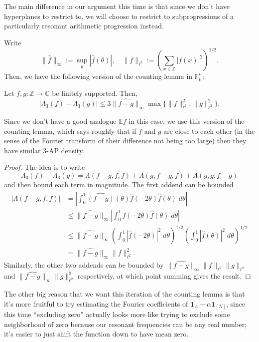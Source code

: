 \documentclass[10pt]{scrartcl}
\providecommand{\CC}{\mathbb C}
\providecommand{\EE}{\mathbb E}
\providecommand{\FF}{\mathbb F}
\providecommand{\ZZ}{\mathbb Z}
\providecommand{\ind}[1]{\mathbf 1_{#1}}
\providecommand{\abs}[1]{\left|{#1}\right|}
\providecommand{\dif}{\;d}
\renewcommand{\hat}{\widehat}
\providecommand{\norm}[1]{\| #1 \|}
\begin{document}
The main difference in our argument this time is that
since we don't have hyperplanes to restrict to, we will choose to restrict to
subprogressions of a particularly resonant arithmetic progression instead.

Write
\[\norm{\hat f}_\infty := \sup_{\theta}|\hat f(\theta)|,\quad
\norm f_{\ell^2} := \left(\sum_{x\in\ZZ} |f(x)|^2\right)^{1/2}.\]
Then, we have the following version of the counting lemma in $\FF_p^n$:
\begin{lemma}
	Let $f,g\colon\ZZ\to\CC$ be finitely supported. Then,
	\[|\Lambda_3(f) - \Lambda_3(g)| \le 3\norm{\hat{f-g}}_\infty
	\max\{\norm f_{\ell^2}^2, \norm g_{\ell^2}^2\}.\]
\end{lemma}

Since we don't have a good analogue $\EE f$ in this case,
we use this version of the counting lemma, which says roughly that
if $f$ and $g$ are close to each other (in the sense of the
Fourier transform of their difference not being too large)
then they have similar 3-AP density.

\begin{proof}
	The idea is to write
	\[\Lambda_3(f) - \Lambda_3(g) =
	\Lambda(f-g,f,f) + \Lambda(g,f-g,f) + \Lambda(g,g,f-g)\]
	and then bound each term in magnitude. The first addend can be bounded
	\begin{align*}
		|\Lambda(f-g,f,f)| &=
		\abs{\int_0^1 \hat{(f-g)}(\theta)\hat f(-2\theta)\hat f(\theta)\dif\theta}\\
		&\le \norm{\hat{f-g}}_\infty
		\abs{\int_0^1\hat f(-2\theta)\hat f(\theta)\dif\theta}\\
		&\le \norm{\hat{f-g}}_\infty
		\left(\int_0^1|\hat f(-2\theta)|^2\dif\theta\right)^{1/2}
		\left(\int_0^1|\hat f(\theta)|^2\dif\theta\right)^{1/2}\\
		&= \norm{\hat{f-g}}_\infty\norm f_{\ell^2}^2.
	\end{align*}
	Similarly, the other two addends can be bounded by
	$\norm{\hat{f-g}}_\infty\norm f_{\ell^2}\norm g_{\ell^2}$ and
	$\norm{\hat{f-g}}_\infty\norm g_{\ell^2}^2$ respectively,
	at which point summing gives the result.
\end{proof}

The other big reason that we want this iteration of the counting lemma
is that it's more fruitful to try estimating the Fourier coefficients
of $\ind A - \alpha\ind{[N]}$, since this time ``excluding zero''
actually looks more like trying to exclude some neighborhood of zero
because our resonant frequencies can be any real number;
it's easier to just shift the function down to have mean zero.
\end{document}
